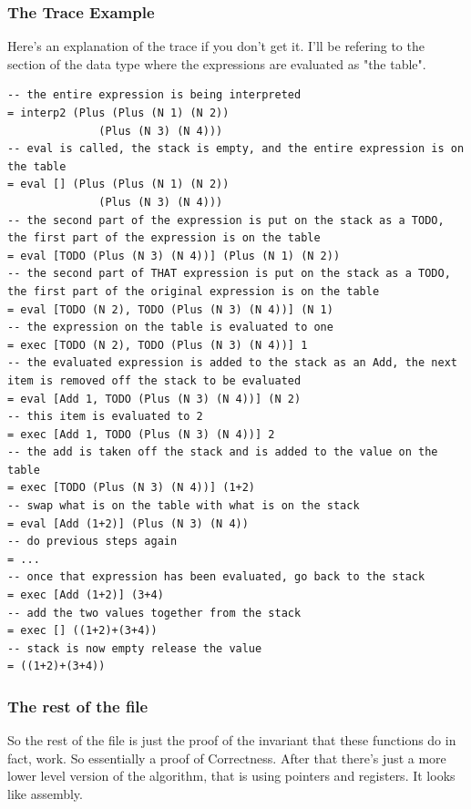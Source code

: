 \documentclass[12pt]{article}
\begin{document}
\subsubsection{The Trace Example}

Here's an explanation of the trace if you don't get it. I'll be refering to the section of the data type where the expressions are evaluated as "the table".

\begin{lstlisting}
-- the entire expression is being interpreted
= interp2 (Plus (Plus (N 1) (N 2))
              (Plus (N 3) (N 4)))
-- eval is called, the stack is empty, and the entire expression is on the table
= eval [] (Plus (Plus (N 1) (N 2))
              (Plus (N 3) (N 4)))
-- the second part of the expression is put on the stack as a TODO, the first part of the expression is on the table
= eval [TODO (Plus (N 3) (N 4))] (Plus (N 1) (N 2))
-- the second part of THAT expression is put on the stack as a TODO, the first part of the original expression is on the table
= eval [TODO (N 2), TODO (Plus (N 3) (N 4))] (N 1)
-- the expression on the table is evaluated to one
= exec [TODO (N 2), TODO (Plus (N 3) (N 4))] 1
-- the evaluated expression is added to the stack as an Add, the next item is removed off the stack to be evaluated
= eval [Add 1, TODO (Plus (N 3) (N 4))] (N 2)
-- this item is evaluated to 2
= exec [Add 1, TODO (Plus (N 3) (N 4))] 2
-- the add is taken off the stack and is added to the value on the table
= exec [TODO (Plus (N 3) (N 4))] (1+2)
-- swap what is on the table with what is on the stack
= eval [Add (1+2)] (Plus (N 3) (N 4))
-- do previous steps again
= ...
-- once that expression has been evaluated, go back to the stack
= exec [Add (1+2)] (3+4)
-- add the two values together from the stack
= exec [] ((1+2)+(3+4))
-- stack is now empty release the value
= ((1+2)+(3+4))
\end{lstlisting}

\subsubsection{The rest of the file}

So the rest of the file is just the proof of the invariant that these functions do in fact, work. So essentially a proof of Correctness. After that there's just a more lower level version of the algorithm, that is using pointers and registers. It looks like assembly.
\end{document}
